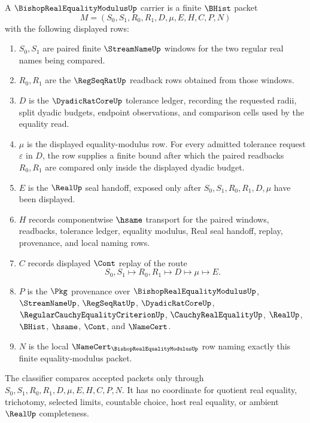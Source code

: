 \begin{definition}
\label{def:bishop-real-equality-modulus-carrier}
A $\BishopRealEqualityModulusUp$ carrier is a finite $\BHist$ packet
$$
M=(S_0,S_1,R_0,R_1,D,\mu,E,H,C,P,N)
$$
with the following displayed rows:
\begin{enumerate}
\item $S_0,S_1$ are paired finite $\StreamNameUp$ windows for the two regular real names being compared.
\item $R_0,R_1$ are the $\RegSeqRatUp$ readback rows obtained from those windows.
\item $D$ is the $\DyadicRatCoreUp$ tolerance ledger, recording the requested radii, split dyadic budgets, endpoint observations, and comparison cells used by the equality read.
\item $\mu$ is the displayed equality-modulus row. For every admitted tolerance request $\varepsilon$ in $D$, the row supplies a finite bound after which the paired readbacks $R_0,R_1$ are compared only inside the displayed dyadic budget.
\item $E$ is the $\RealUp$ seal handoff, exposed only after $S_0,S_1,R_0,R_1,D,\mu$ have been displayed.
\item $H$ records componentwise $\hsame$ transport for the paired windows, readbacks, tolerance ledger, equality modulus, Real seal handoff, replay, provenance, and local naming rows.
\item $C$ records displayed $\Cont$ replay of the route
$$
S_0,S_1 \longmapsto R_0,R_1 \longmapsto D \longmapsto \mu \longmapsto E .
$$
\item $P$ is the $\Pkg$ provenance over $\BishopRealEqualityModulusUp$, $\StreamNameUp$, $\RegSeqRatUp$, $\DyadicRatCoreUp$, $\RegularCauchyEqualityCriterionUp$, $\CauchyRealEqualityUp$, $\RealUp$, $\BHist$, $\hsame$, $\Cont$, and $\NameCert$.
\item $N$ is the local $\NameCert_{\BishopRealEqualityModulusUp}$ row naming exactly this finite equality-modulus packet.
\end{enumerate}
The classifier compares accepted packets only through $S_0,S_1,R_0,R_1,D,\mu,E,H,C,P,N$. It has no coordinate for quotient real equality, trichotomy, selected limits, countable choice, host real equality, or ambient $\RealUp$ completeness.
\end{definition}

